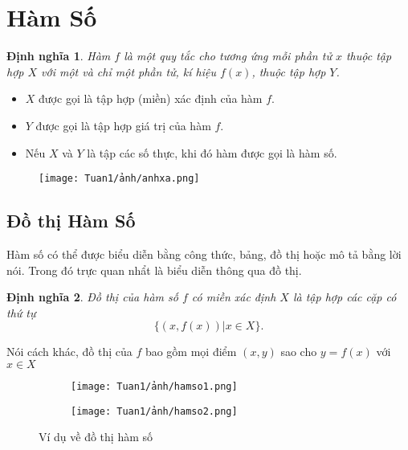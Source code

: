 \newtheorem{definition}{Định nghĩa}[section]    
\newtheorem{theorem}{Định lý}
\newtheorem{corollary}[theorem]{Hệ quả}
\newtheorem{lemma}[theorem]{Bổ đề}

\section{Hàm Số}    
\begin{definition}
Hàm $f$ là một quy tắc cho tương ứng mỗi phần tử $x$ thuộc tập hợp $X$ với một và chỉ một phần tử, kí hiệu $f(x)$, thuộc tập hợp $Y$.
\end{definition}    
\begin{itemize}
    \item $X$ được gọi là tập hợp (miền) xác định của hàm $f$.    
    \item $Y$ được gọi là tập hợp giá trị của hàm $f$. 
    \item Nếu $X$ và $Y$ là tập các số thực, khi đó hàm được gọi là hàm số.
\end{itemize}

\begin{figure}[htbp]
    \centering
    \texttt{[image: Tuan1/ảnh/anhxa.png]}\label{anh1.1}
\end{figure}
\subsection{Đồ thị Hàm Số}
Hàm số có thể được biểu diễn bằng công thức, bảng, đồ thị hoặc mô tả bằng lời nói. Trong đó trực quan nhẩt là biểu diễn thông qua đồ thị. 
\begin{definition}
    Đồ thị của hàm số $f$ có miền xác định $X$ là tập hợp các cặp có thứ tự  \[ \{\left(x,f(x)\right)\vert x\in X \} .\] 
\end{definition}
Nói cách khác, đồ thị của $f$ bao gồm mọi điểm $(x,y)$ sao cho $y=f(x)$ với $x\in X$
\begin{figure}[htbp]
    \centering
    \begin{subfigure}{0.4\textwidth}
        \centering
        \texttt{[image: Tuan1/ảnh/hamso1.png]}
        \caption{}
    \end{subfigure}
    \hfill
    \begin{subfigure}{0.5\textwidth}
        \centering
        \texttt{[image: Tuan1/ảnh/hamso2.png]}
        \caption{}
    \end{subfigure}
    \caption{Ví dụ về đồ thị hàm số}\label{anh1.2}
    \end{figure}

